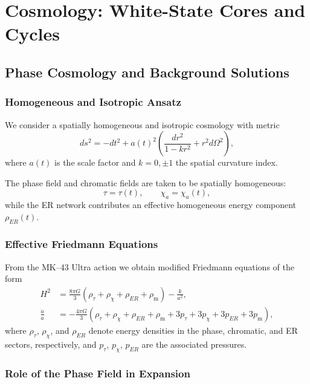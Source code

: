 

\part{Cosmology: White-State Cores and Cycles}

\chapter{Phase Cosmology and Background Solutions}

\section{Homogeneous and Isotropic Ansatz}

We consider a spatially homogeneous and isotropic cosmology with metric
\[
  ds^2 = -dt^2 + a(t)^2 \left( \frac{dr^2}{1-kr^2} + r^2 d\Omega^2 \right),
\]
where $a(t)$ is the scale factor and $k=0,\pm 1$ the spatial curvature index.

The phase field and chromatic fields are taken to be spatially homogeneous:
\[
  \tau = \tau(t), \qquad \chi_a = \chi_a(t),
\]
while the ER network contributes an effective homogeneous energy component $\rho_{ER}(t)$.

\section{Effective Friedmann Equations}

From the MK--43 Ultra action we obtain modified Friedmann equations of the form
\begin{align}
  H^2 &=
  \frac{8\pi G}{3}\left(\rho_\tau + \rho_\chi + \rho_{ER} + \rho_{\mathrm{m}}\right)
  - \frac{k}{a^2},
  \\
  \frac{\ddot{a}}{a} &=
  -\frac{4\pi G}{3}\left(
    \rho_\tau + \rho_\chi + \rho_{ER} + \rho_{\mathrm{m}}
    + 3p_\tau + 3p_\chi + 3p_{ER} + 3p_{\mathrm{m}}
  \right),
\end{align}
where $\rho_\tau$, $\rho_\chi$, and $\rho_{ER}$ denote energy densities in the phase, chromatic, and ER sectors, respectively, and $p_\tau$, $p_\chi$, $p_{ER}$ are the associated pressures.

\section{Role of the Phase Field in Expansion}

